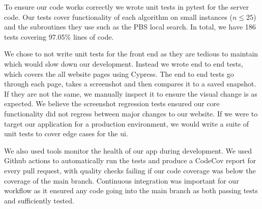 To ensure our code works correctly we wrote unit tests in pytest for the server code. Our tests cover functionality of each algorithm on small instances ($n\leq 25$) and the subroutines they use such as the PBS local search. In total, we have 186 tests covering 97.05\% lines of code. 

We chose to not write unit tests for the front end as they are tedious to maintain which would slow down our development. Instead we wrote end to end tests, which covers the all website pages using Cypress. The end to end tests go through each page, takes a screenshot and then compares it to a saved snapshot. If they are not the same, we manually inspect it to ensure the visual change is as expected. We believe the screenshot regression tests ensured our core functionality did not regress between major changes to our website. If we were to target our application for a production environment, we would write a suite of unit tests to cover edge cases for the \acrshort{ui}.

We also used tools monitor the health of our app during development. We used Github actions to automatically run the tests and produce a CodeCov report for every pull request, with quality checks failing if our code coverage was below the coverage of the main branch. Continuous integration was important for our workflow as it ensured any code going into the main branch as both passing tests and sufficiently tested.